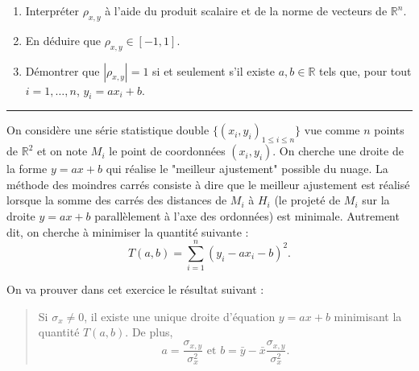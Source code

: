 \documentclass[../PolyS4.tex]{subfiles}
\begin{document}
\begin{enumerate}
\item Interpréter $\rho_{x,y}$ à l'aide du produit scalaire et de la norme de vecteurs de $\mathbb R^n$.
\item En déduire que $\rho_{x,y}\in [-1,1]$.
\item Démontrer que $|\rho_{x,y}|=1$ si et seulement s'il existe $a,b\in\mathbb R$ tels que, pour tout $i=1,\dots,n$, $y_i=ax_i+b$.
\end{enumerate}

\vspace{1em}
\hrule
\vspace{1em}


On considère une série statistique double $\{(x_i,y_i)_{1\leq i\leq n}\}$ vue comme $n$ points de $\mathbb R^2$ et on note $M_i$ le point de coordonnées $(x_i,y_i)$. 
On cherche une droite de la forme $y=ax+b$ qui réalise le "meilleur ajustement" possible du nuage. La méthode des moindres carrés consiste à dire que le meilleur ajustement est réalisé lorsque la somme des carrés des distances de $M_i$ à $H_i$ (le projeté de $M_i$ sur la droite $y=ax+b$ parallèlement à l'axe des ordonnées) est minimale. Autrement dit, on cherche à minimiser la quantité suivante :
$$T(a,b)=\sum_{i=1}^n (y_i-ax_i-b)^2.$$

On va prouver dans cet exercice le résultat suivant :
\begin{quote}
Si $\sigma_x\neq 0$, il existe une unique droite d'équation $y=ax+b$ minimisant la quantité $T(a,b)$. De plus, 
$$a=\frac{\sigma_{x,y}}{\sigma_x^2}\textrm{ et }b=\bar y-\bar x\frac{\sigma_{x,y}}{\sigma_x^2}.$$
\end{quote}
\end{document}
